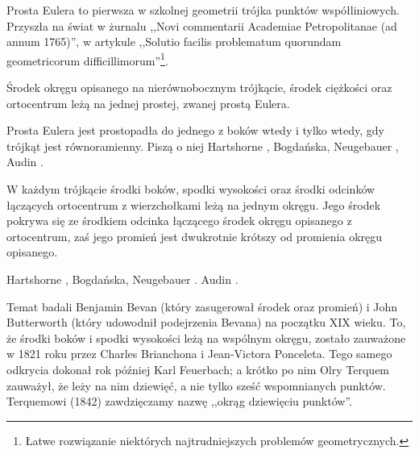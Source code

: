 %

Prosta Eulera to pierwsza w szkolnej geometrii trójka punktów współliniowych.
Przyszła na świat w żurnalu ,,Novi commentarii Academiae Petropolitanae (ad annum 1765)'', w artykule ,,Solutio facilis problematum quorundam geometricorum difficillimorum''\footnote{Łatwe rozwiązanie niektórych najtrudniejszych problemów geometrycznych.}.

\begin{proposition}
	\label{prosta_eulera}
	Środek okręgu opisanego na nierównobocznym trójkącie, środek ciężkości oraz ortocentrum leżą na jednej prostej, zwanej prostą Eulera.
\end{proposition}

Prosta Eulera jest prostopadła do jednego z boków wtedy i tylko wtedy, gdy trójkąt jest równoramienny.
Piszą o niej Hartshorne \cite[s. 54, 55]{hartshorne2000}, Bogdańska, Neugebauer \cite[s. 84]{neugebauer_2018}, Audin \cite[s. 61]{audin_2003}.

\begin{proposition}
	\label{okrag_dziewieciu_punktow}
	W każdym trójkącie środki boków, spodki wysokości oraz środki odcinków łączących ortocentrum z wierzchołkami leżą na jednym okręgu.
	Jego środek pokrywa się ze środkiem odcinka łączącego środek okręgu opisanego z ortocentrum, zaś jego promień jest dwukrotnie krótszy od promienia okręgu opisanego.
\end{proposition}

Hartshorne \cite[s. 57, 60]{hartshorne2000}, Bogdańska, Neugebauer \cite[s. 85, 86]{neugebauer_2018}.
Audin \cite[s. 62]{audin_2003}.

Temat badali Benjamin Bevan (który zasugerował środek oraz promień) i John Butterworth (który udowodnił podejrzenia Bevana) na początku XIX wieku.
%
%
To, że środki boków i spodki wysokości leżą na wspólnym okręgu, zostało zauważone w 1821 roku przez Charles Brianchona i Jean-Victora Ponceleta.
%
%
Tego samego odkrycia dokonał rok później Karl Feuerbach; a krótko po nim Olry Terquem zauważył, że leży na nim dziewięć, a nie tylko sześć wspomnianych punktów.
%
%
Terquemowi (1842) zawdzięczamy nazwę ,,okrąg dziewięciu punktów''.

